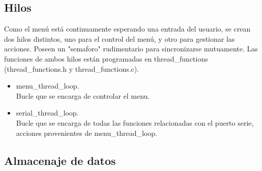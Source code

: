 \subsection{Hilos}
Como el menú está continuamente esperando una entrada del usuario, se crean dos hilos distintos, uno para el control del menú, y otro para gestionar las acciones. Poseen un "semaforo" rudimentario para sincronizarse mutuamente. Las funciones de ambos hilos están programadas en thread\_functions (thread\_functions.h y thread\_functions.c).
\begin{itemize}
    \item menu\_thread\_loop. \\
    Bucle que se encarga de controlar el menu.

    \item serial\_thread\_loop. \\
    Bucle que se encarga de todas las funciones relacionadas con el puerto serie, acciones provenientes de menu\_thread\_loop.
\end{itemize}

\subsection{Almacenaje de datos}
    






